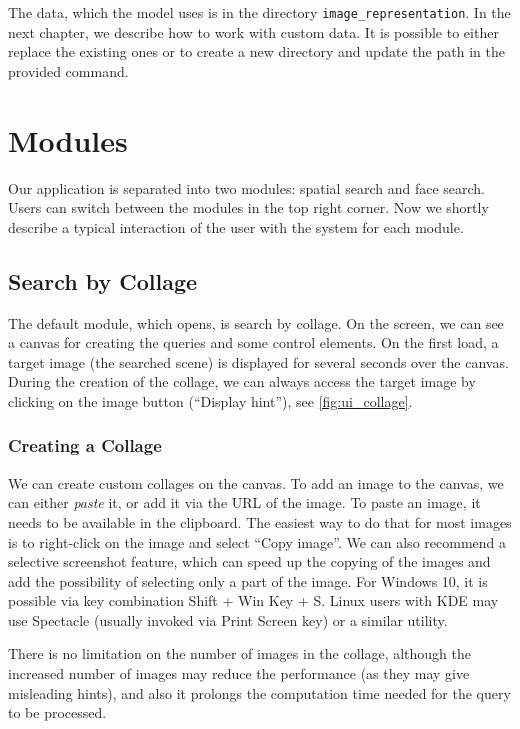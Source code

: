 The data, which the model uses is in the directory \verb+image_representation+. In the next chapter, we describe how to work with custom data. It is possible to either replace the existing ones or to create a new directory and update the path in the provided command.

\section{Modules}

Our application is separated into two modules: spatial search and face search. Users can switch between the modules in the top right corner. Now we shortly describe a typical interaction of the user with the system for each module.

\subsection{Search by Collage}

The default module, which opens, is search by collage. On the screen, we can see a canvas for creating the queries and some control elements. On the first load, a target image (the searched scene) is displayed for several seconds over the canvas. During the creation of the collage, we can always access the target image by clicking on the image button (``Display hint''), see \autoref{fig:ui_collage}.

\subsubsection*{Creating a Collage}

We can create custom collages on the canvas. To add an image to the canvas, we can either \emph{paste} it, or add it via the URL of the image. To paste an image, it needs to be available in the clipboard. The easiest way to do that for most images is to right-click on the image and select ``Copy image''. We can also recommend a selective screenshot feature, which can speed up the copying of the images and add the possibility of selecting only a part of the image. For Windows 10, it is possible via key combination Shift + Win Key + S. Linux users with KDE may use Spectacle (usually invoked via Print Screen key) or a similar utility.

There is no limitation on the number of images in the collage, although the increased number of images may reduce the performance (as they may give misleading hints), and also it prolongs the computation time needed for the query to be processed.

